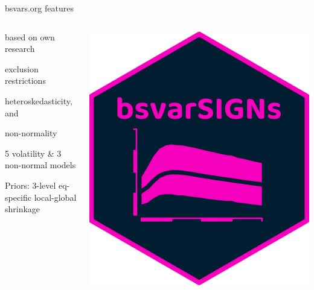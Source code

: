 \documentclass[aspectratio=1610,notes,blackandwhite,mathsans,usenames,dvipsnames]{beamer}
\begin{document}
\begin{frame}{\huge bsvars.org features}
\begin{columns}
\begin{column}{0.5\textwidth}
				\large
				\begin{itemize}[label=$\blacktriangleright$]
				{\color{lig}
					\item based on own research\\ [1ex]
					\item exclusion restrictions\\[1ex]
					\item heteroskedasticity, and\\[1ex]
					\item non-normality\\[1ex]
					\item 5 volatility \& 3 non-normal models\\[1ex]
					\item Priors: 3-level eq-specific local-global shrinkage
				}	
				\end{itemize}
			\end{column}
			\begin{column}{0.5\textwidth}
				\includegraphics[scale=0.35]{bsvarSIGNs}\\[1ex]
				

\end{column}
\end{columns}
\end{frame}
\end{document}
